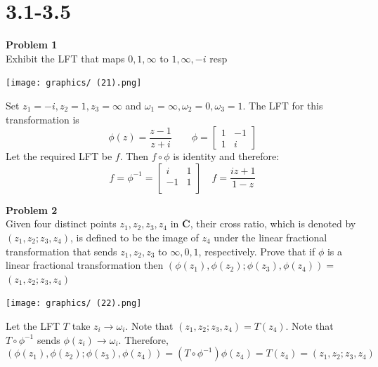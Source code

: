 \documentclass[12pt,oneside]{book}
\begin{document}
\section{3.1-3.5}
\begin{tcolorbox}[colback=blue!15]
    \textbf{Problem 1}\\
    Exhibit the LFT that maps $0,1,\infty$ to $1,\infty,-i$ resp
\end{tcolorbox}
\begin{marginfigure}%
    \texttt{[image: graphics/ (21).png]}
\end{marginfigure}%
Set $z_1=-i,z_2=1,z_3=\infty$ and $\omega_1=\infty,\omega_2=0,\omega_3=1$. The LFT for this transformation is 
$$\phi(z)=\frac{z-1}{z+i}\qquad\phi=\begin{bmatrix}
    1 &-1\\
    1 &i
\end{bmatrix}$$
Let the required LFT  be $f$. Then $f\circ\phi$ is identity and therefore:
$$f=\phi^{-1}=\begin{bmatrix}
    i &1\\
    -1 &1\\
\end{bmatrix}\quad f=\frac{iz+1}{1-z}$$


\begin{tcolorbox}[colback=blue!15]
    \textbf{Problem 2}\\
    Given four distinct points $z_1, z_2, z_3, z_4$ in $\overline{\mathbf{C}}$, their cross ratio, which is denoted by $\left(z_1, z_2 ; z_3, z_4\right)$, is defined to be the image of $z_4$ under the linear fractional transformation that sends $z_1, z_2, z_3$ to $\infty, 0,1$, respectively. Prove that if $\phi$ is a linear fractional transformation then $\left(\phi\left(z_1\right), \phi\left(z_2\right) ; \phi\left(z_3\right), \phi\left(z_4\right)\right)=$ $\left(z_1, z_2 ; z_3, z_4\right)$
\end{tcolorbox}
\begin{marginfigure}%
    \texttt{[image: graphics/ (22).png]}
\end{marginfigure}%
Let the LFT $T$ take $z_i\to \omega_i$. Note that $(z_1,z_2;z_3,z_4)=T(z_4)$. Note that $T\circ \phi^{-1}$ sends $\phi(z_i)\to \omega_i$. Therefore,
$$(\phi(z_1),\phi(z_2);\phi(z_3),\phi(z_4))=(T\circ\phi^{-1})\phi(z_4)=T(z_4)=(z_1,z_2;z_3,z_4)$$
\end{document}

